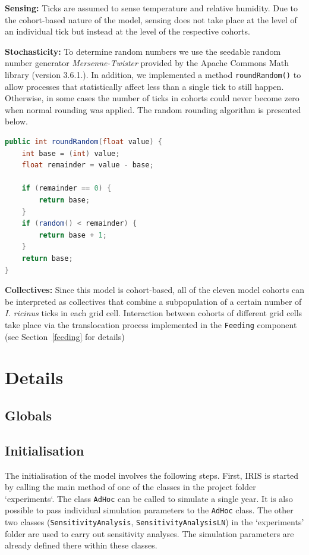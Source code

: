 \documentclass[a4paper, 11pt]{scrartcl}
\newcommand{\inlinecode}[1]{\texttt{\small #1}}
\begin{document}
\textbf{Sensing:} Ticks are assumed to sense temperature and relative humidity. Due to the cohort-based nature of the model, sensing does not take place at the level of an individual tick but instead at the level of the respective cohorts.

\textbf{Stochasticity:} To determine random numbers we use the seedable random number generator \emph{Mersenne-Twister} provided by the Apache Commons Math library (version 3.6.1.). In addition, we implemented a method \inlinecode{roundRandom()} to allow processes that statistically affect less than a single tick to still happen. Otherwise, in some cases the number of ticks in cohorts could never become zero when normal rounding was applied. The random rounding algorithm is presented below.

\begin{lstlisting}[language = Java, caption = {Overview of roundRandom() method}]
public int roundRandom(float value) {
	int base = (int) value;
	float remainder = value - base;
	
	if (remainder == 0) {
		return base;
	}
	if (random() < remainder) {
		return base + 1;
	}
	return base;
}
\end{lstlisting}


\textbf{Collectives:} Since this model is cohort-based, all of the eleven model cohorts can be interpreted as collectives that combine a subpopulation of a certain number of \emph{I. ricinus} ticks in each grid cell. Interaction between cohorts of different grid cells take place via the translocation process implemented in the \inlinecode{Feeding} component (see Section~\ref{feeding} for details)


\newpage
\section{Details}

\subsection{Globals}

\subsection{Initialisation}\label{initialisation}
The initialisation of the model involves the following steps. First, IRIS is started by calling the main method of one of the classes in the project folder `experiments`. The class \inlinecode{AdHoc} can be called to simulate a single year. It is also possible to pass individual simulation parameters to the \inlinecode{AdHoc} class. The other two classes (\inlinecode{SensitivityAnalysis}, \inlinecode{SensitivityAnalysisLN}) in the `experiments' folder are used to carry out sensitivity analyses. The simulation parameters are already defined there within these classes.
\end{document}
